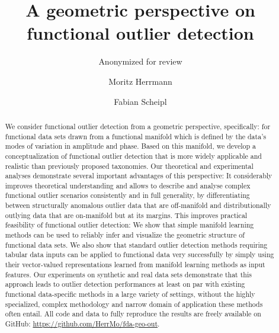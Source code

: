 \title{A geometric perspective on functional outlier detection}

%

\author{Anonymized for review}
\author{Moritz Herrmann \and Fabian Scheipl}



\maketitle

\begin{abstract}
We consider functional outlier detection from a geometric perspective, specifically: for functional data sets drawn from a functional manifold which is defined by the data's modes of variation in amplitude and phase.
Based on this manifold, we develop a conceptualization of functional outlier detection that is more widely applicable and realistic than previously proposed taxonomies.
Our theoretical and experimental analyses demonstrate several important advantages of this perspective:
It considerably improves theoretical understanding and allows to describe and analyse complex functional outlier scenarios consistently and in full generality, by differentiating between structurally anomalous outlier data that are off-manifold and distributionally outlying data that are on-manifold but at its margins.
This improves practical feasibility of functional outlier detection: We show that simple manifold learning methods can be used to reliably infer and visualize the geometric structure of functional data sets.
We also show that standard outlier detection methods requiring tabular data inputs can be applied to functional data very successfully by simply using their vector-valued representations learned from manifold learning methods as input features.
Our experiments on synthetic and real data sets demonstrate that this approach leads to outlier detection performances at least on par with existing functional data-specific methods in a large variety of settings, without the highly specialized, complex methodology and narrow domain of application these methods often entail. All code and data to fully reproduce the results are freely available on GitHub: \url{https://github.com/HerrMo/fda-geo-out}.
\end{abstract}
